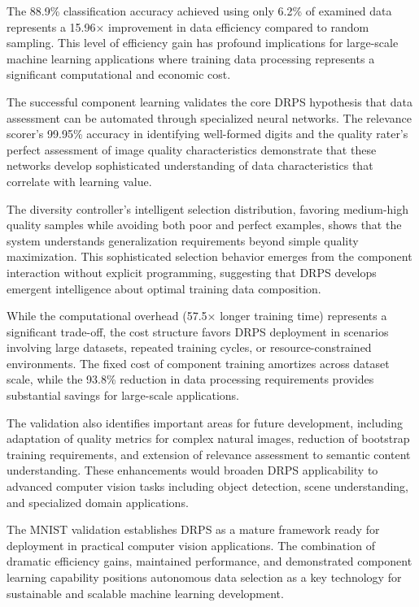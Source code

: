 \documentclass[12pt]{article}
\begin{document}
The 88.9\% classification accuracy achieved using only 6.2\% of examined data represents a 15.96× improvement in data efficiency compared to random sampling. This level of efficiency gain has profound implications for large-scale machine learning applications where training data processing represents a significant computational and economic cost.

The successful component learning validates the core DRPS hypothesis that data assessment can be automated through specialized neural networks. The relevance scorer's 99.95\% accuracy in identifying well-formed digits and the quality rater's perfect assessment of image quality characteristics demonstrate that these networks develop sophisticated understanding of data characteristics that correlate with learning value.

The diversity controller's intelligent selection distribution, favoring medium-high quality samples while avoiding both poor and perfect examples, shows that the system understands generalization requirements beyond simple quality maximization. This sophisticated selection behavior emerges from the component interaction without explicit programming, suggesting that DRPS develops emergent intelligence about optimal training data composition.

While the computational overhead (57.5× longer training time) represents a significant trade-off, the cost structure favors DRPS deployment in scenarios involving large datasets, repeated training cycles, or resource-constrained environments. The fixed cost of component training amortizes across dataset scale, while the 93.8\% reduction in data processing requirements provides substantial savings for large-scale applications.

The validation also identifies important areas for future development, including adaptation of quality metrics for complex natural images, reduction of bootstrap training requirements, and extension of relevance assessment to semantic content understanding. These enhancements would broaden DRPS applicability to advanced computer vision tasks including object detection, scene understanding, and specialized domain applications.

The MNIST validation establishes DRPS as a mature framework ready for deployment in practical computer vision applications. The combination of dramatic efficiency gains, maintained performance, and demonstrated component learning capability positions autonomous data selection as a key technology for sustainable and scalable machine learning development.
\end{document}
